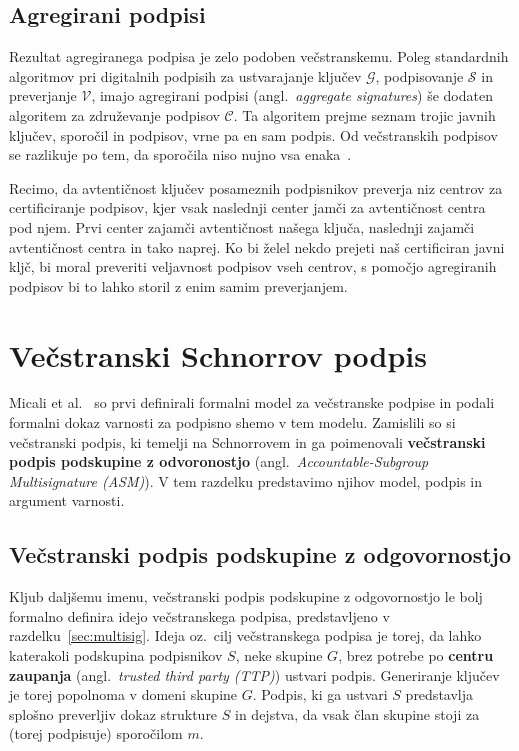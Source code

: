 \documentclass[isrm2, tisk]{fmfdelo}
\begin{document}
\subsection{Agregirani podpisi}
Rezultat agregiranega podpisa je zelo podoben večstranskemu. Poleg standardnih algoritmov pri digitalnih
podpisih za ustvarajanje ključev $\mathcal{G}$, podpisovanje $\mathcal{S}$ in preverjanje $\mathcal{V}$,
imajo agregirani podpisi (angl.\ \textit{aggregate signatures}) še dodaten algoritem za združevanje
podpisov $\mathcal{C}$. Ta algoritem prejme seznam trojic javnih ključev, sporočil in podpisov, vrne
pa en sam podpis. Od večstranskih podpisov se razlikuje po tem, da sporočila niso nujno vsa
enaka~\cite{boneh2011aggregate}.

\begin{primer}
    Recimo, da avtentičnost ključev posameznih podpisnikov preverja niz centrov za certificiranje
    podpisov, kjer vsak naslednji center jamči za avtentičnost centra pod njem. Prvi center zajamči
    avtentičnost našega ključa, naslednji zajamči avtentičnost centra in tako naprej. Ko bi želel
    nekdo prejeti naš certificiran javni kljč, bi moral preveriti veljavnost podpisov vseh centrov,
    s pomočjo agregiranih podpisov bi to lahko storil z enim samim preverjanjem.
\end{primer}

\section{Večstranski Schnorrov podpis}
\label{sec:multischnorr}
Micali et al.~\cite{micali2001asm} so prvi definirali formalni model za večstranske podpise in podali 
formalni dokaz varnosti za podpisno shemo v tem modelu. Zamislili so si večstranski podpis, ki temelji 
na Schnorrovem in ga poimenovali \textbf{večstranski podpis podskupine z odvoronostjo} (angl.\ 
\textit{Accountable-Subgroup Multisignature (ASM)}). V tem razdelku predstavimo njihov model, podpis 
in argument varnosti.

\subsection{Večstranski podpis podskupine z odgovornostjo}
Kljub daljšemu imenu, večstranski podpis podskupine z odgovornostjo le bolj formalno definira idejo 
večstranskega podpisa, predstavljeno v razdelku~\ref{sec:multisig}. Ideja oz.\ cilj večstranskega 
podpisa je torej, da lahko katerakoli podskupina podpisnikov $S$, neke skupine $G$, brez potrebe po 
\textbf{centru zaupanja} (angl.\ \textit{trusted third party (TTP)}) ustvari podpis. 
Generiranje ključev je torej popolnoma v domeni skupine $G$. Podpis, ki ga ustvari $S$ predstavlja 
splošno preverljiv dokaz strukture $S$ in dejstva, da vsak član skupine stoji za (torej podpisuje) 
sporočilom $m$.
\end{document}
